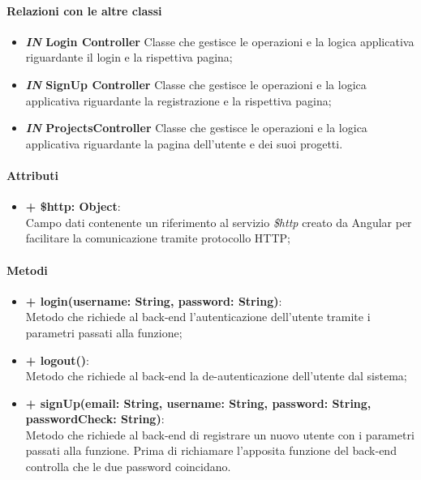 	\paragraph{Relazioni con le altre classi}
	\begin{itemize}
		\item \textbf{\textit{IN} Login Controller}
		Classe che gestisce le operazioni e la logica applicativa riguardante il login e la rispettiva pagina;
		\item \textbf{\textit{IN} SignUp Controller}
		Classe che gestisce le operazioni e la logica applicativa riguardante la registrazione e la rispettiva pagina;
		\item \textbf{\textit{IN} ProjectsController}
		Classe che gestisce le operazioni e la logica applicativa riguardante la pagina dell'utente e dei suoi progetti.
	\end{itemize}
	
	\paragraph{Attributi}
	\begin{itemize}
		\item \textbf{+ \$http: Object}:\\
		Campo dati contenente un riferimento al servizio \textit{\$http} creato da Angular per facilitare la comunicazione tramite protocollo HTTP;
	\end{itemize}
	
	\paragraph{Metodi}
	\begin{itemize}
		\item \textbf{+ login(username: String, password: String)}:\\
		Metodo che richiede al back-end l'autenticazione dell'utente tramite i parametri passati alla funzione;
		\item \textbf{+ logout()}:\\
		Metodo che richiede al back-end la de-autenticazione dell'utente dal sistema;
		\item \textbf{+ signUp(email: String, username: String, password: String, passwordCheck: String)}:\\
		Metodo che richiede al back-end di registrare un nuovo utente con i parametri passati alla funzione. Prima di richiamare l'apposita funzione del back-end controlla che le due password coincidano.
	\end{itemize}
	
